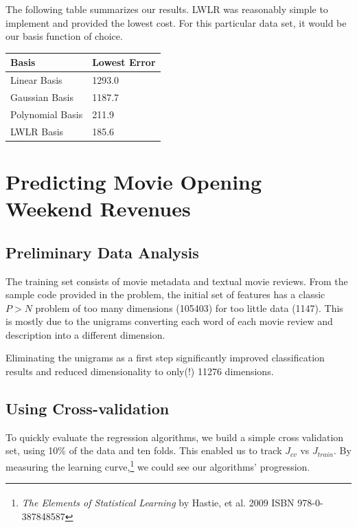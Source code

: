 \documentclass[11pt, oneside]{article}   	%
\begin{document}
The following table summarizes our results. LWLR was reasonably simple to implement and provided the lowest cost. For this particular data set, it would be our basis function of choice.

\begin{center}
    \begin{tabular}{| l | l |}
    \hline
    Basis & Lowest Error \\ \hline
    Linear Basis & \hfill 1293.0 \\
    Gaussian Basis & \hfill 1187.7 \\
    Polynomial Basis & \hfill 211.9 \\
    LWLR Basis & \hfill 185.6 \\
    \hline
    \end{tabular}
\end{center}
\clearpage

\section*{Predicting Movie Opening Weekend Revenues}


\subsection*{Preliminary Data Analysis}

The training set consists of movie metadata and textual movie reviews. From the sample code provided in the problem, the initial set of features has a classic $P > N$ problem of too many dimensions (105403) for too little data (1147).  This is mostly due to the unigrams converting each word of each movie review and description into a different dimension.

Eliminating the unigrams as a first step significantly improved classification results and reduced dimensionality to only(!) 11276 dimensions. 
\subsection*{Using Cross-validation}

To quickly evaluate the regression algorithms, we build a simple cross validation set, using 10\% of the data and ten folds. This enabled us to track $J_{cv}$ vs $J_{train}$. By measuring the learning curve,\footnote{\emph{The Elements of Statistical Learning} by Hastie, et al. \textsuperscript{\textcopyright} 2009 ISBN 978-0-387848587} we could see our algorithms' progression.
\end{document}
